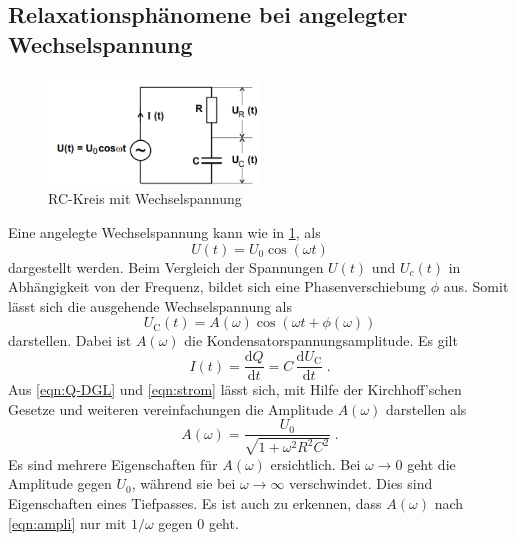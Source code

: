 \subsection{Relaxationsphänomene bei angelegter Wechselspannung}
\begin{figure}
    \centering
    \caption{RC-Kreis mit Wechselspannung} 
    \label{fig:Wechs}
    \includegraphics[width = 0.5\textwidth]{pics/wechselspannung-RC.png}
\end{figure}
Eine angelegte Wechselspannung kann wie in \ref{fig:Wechs}, als 
\begin{equation*}
    U(t)=U_0 \cos(\omega t)
\end{equation*}
dargestellt werden. Beim Vergleich der Spannungen $U(t)$ und $U_c(t)$ in Abhängigkeit von der Frequenz, bildet sich eine Phasenverschiebung $\phi$ aus.
Somit lässt sich die ausgehende Wechselspannung als
\begin{equation}
    U_\text{C}(t)= A(\omega) \cos (\omega t + \phi (\omega))
\end{equation}
darstellen. Dabei ist $A(\omega)$ die Kondensatorspannungsamplitude.
Es gilt 
\begin{equation}
    \label{eqn:strom}
    I(t)= \frac{\text{d}Q}{\text{d}t}=C\, \frac{\text{d}U_\text{C}}{\text{d}t}\; \text{.}
\end{equation}
Aus \eqref{eqn:Q-DGL} und \eqref{eqn:strom} lässt sich, mit Hilfe der Kirchhoff'schen Gesetze 
und weiteren vereinfachungen die Amplitude $A(\omega)$ darstellen als
\begin{equation}
    \label{eqn:ampli}
    A(\omega)=\frac{U_0}{\sqrt{1+\omega^2 R^2 C^2}} \; \text{.}
\end{equation}
Es sind mehrere Eigenschaften für $A(\omega)$ ersichtlich. Bei $\omega \rightarrow 0$ geht die Amplitude gegen $U_0$, während sie bei 
$\omega \rightarrow \infty$ verschwindet. Dies sind Eigenschaften eines Tiefpasses. Es ist auch zu erkennen, dass $A(\omega)$ nach \eqref{eqn:ampli}
nur mit $1/\omega$ gegen $0$ geht.
